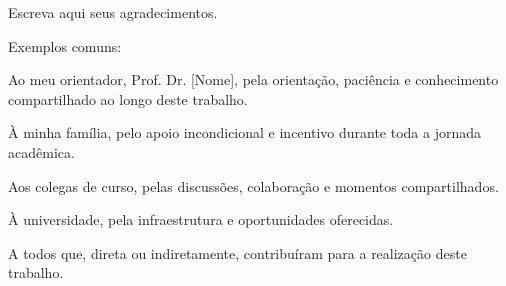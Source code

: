 \begin{agradecimentos}
Escreva aqui seus agradecimentos.

Exemplos comuns:

Ao meu orientador, Prof. Dr. [Nome], pela orientação, paciência e conhecimento compartilhado ao longo deste trabalho.

À minha família, pelo apoio incondicional e incentivo durante toda a jornada acadêmica.

Aos colegas de curso, pelas discussões, colaboração e momentos compartilhados.

À universidade, pela infraestrutura e oportunidades oferecidas.

A todos que, direta ou indiretamente, contribuíram para a realização deste trabalho.

\end{agradecimentos}

